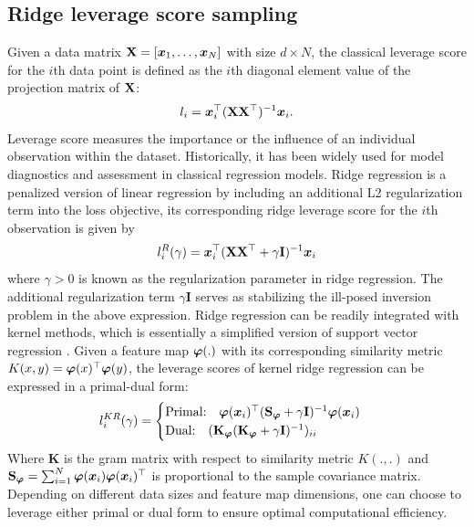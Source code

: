 \subsection{Ridge leverage score sampling}
Given a data matrix $\mathbf{X} = [\boldsymbol{x}_1,\dots,\boldsymbol{x}_N]$ with size $d\times N$, the classical leverage score for the $i$th data point is defined as the $i$th diagonal element value of the projection matrix of $\mathbf{X}$:
\begin{equation}
    l_{i} = \boldsymbol{x}_i^\top (\mathbf{X}\mathbf{X}^\top)^{-1}\boldsymbol{x}_i.
\end{equation}
Leverage score measures the importance or the influence of an individual observation within the dataset. Historically, it has been widely used for model diagnostics and assessment in classical regression models. Ridge regression is a penalized version of linear regression by including an additional L2 regularization term into the loss objective, its corresponding ridge leverage score for the $i$th observation is given by  
\begin{equation}
    l_{i}^{R}(\gamma) = \boldsymbol{x}_i^\top (\mathbf{X}\mathbf{X}^\top + \gamma\mathbf{I})^{-1}\boldsymbol{x}_i
\end{equation}
where $\gamma > 0$ is known as the regularization parameter in ridge regression. The additional regularization term $\gamma\mathbf{I}$ serves as stabilizing the ill-posed inversion problem in the above expression. Ridge regression can be readily integrated with kernel methods, which is essentially a simplified version of support vector regression \cite{vovkKernelRidgeRegression2013}. Given a feature map $\boldsymbol{\varphi}(.)$ with its corresponding similarity metric $K(x,y)=\boldsymbol{\varphi}(x)^\top\boldsymbol{\varphi}(y)$, the leverage scores of kernel ridge regression can be expressed in a primal-dual form:
\begin{equation}
l_{i}^{KR}(\gamma) = 
    \begin{cases} \text{Primal:} \quad
\boldsymbol{\varphi}(\boldsymbol{x}_i)^\top(\mathbf{S}_{\boldsymbol{\varphi}}+\gamma\mathbf{I})^{-1}\boldsymbol{\varphi}(\boldsymbol{x}_i) 
\\
\text{Dual:} \quad
(\mathbf{K}_{\boldsymbol{\varphi}}(\mathbf{K}_{\boldsymbol{\varphi}}+\gamma\mathbf{I})^{-1})_{ii}
    \end{cases}
\end{equation}
Where $\mathbf{K}$ is the gram matrix with respect to similarity metric $K(.,.)$ and $\mathbf{S}_{\boldsymbol{\varphi}} = \sum_{i=1}^{N}\boldsymbol{\varphi}(\boldsymbol{x}_i)\boldsymbol{\varphi}(\boldsymbol{x}_i)^\top$ is proportional to the sample covariance matrix. Depending on different data sizes and feature map dimensions, one can choose to leverage either primal or dual form to ensure optimal computational efficiency. 

